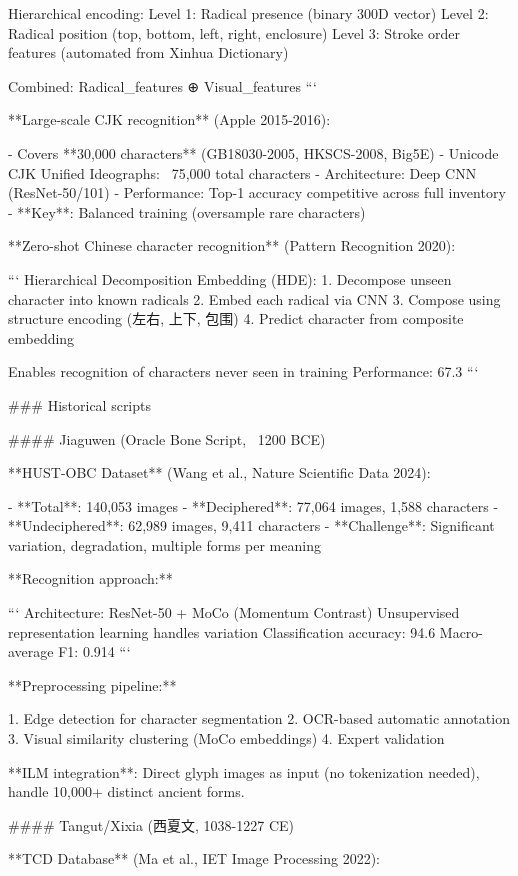\documentclass[11pt]{article}
\begin{document}
Hierarchical encoding:
Level 1: Radical presence (binary 300D vector)
Level 2: Radical position (top, bottom, left, right, enclosure)
Level 3: Stroke order features (automated from Xinhua Dictionary)

Combined: Radical_features ⊕ Visual_features
```

**Large-scale CJK recognition** (Apple 2015-2016):

- Covers **30,000 characters** (GB18030-2005, HKSCS-2008, Big5E)
- Unicode CJK Unified Ideographs: ~75,000 total characters
- Architecture: Deep CNN (ResNet-50/101)
- Performance: Top-1 accuracy competitive across full inventory
- **Key**: Balanced training (oversample rare characters)

**Zero-shot Chinese character recognition** (Pattern Recognition 2020):

```
Hierarchical Decomposition Embedding (HDE):
1. Decompose unseen character into known radicals
2. Embed each radical via CNN
3. Compose using structure encoding (左右, 上下, 包围)
4. Predict character from composite embedding

Enables recognition of characters never seen in training
Performance: 67.3%
```

### Historical scripts

#### Jiaguwen (Oracle Bone Script, ~1200 BCE)

**HUST-OBC Dataset** (Wang et al., Nature Scientific Data 2024):

- **Total**: 140,053 images
- **Deciphered**: 77,064 images, 1,588 characters
- **Undeciphered**: 62,989 images, 9,411 characters
- **Challenge**: Significant variation, degradation, multiple forms per meaning

**Recognition approach:**

```
Architecture: ResNet-50 + MoCo (Momentum Contrast)
Unsupervised representation learning handles variation
Classification accuracy: 94.6%
Macro-average F1: 0.914
```

**Preprocessing pipeline:**

1. Edge detection for character segmentation
2. OCR-based automatic annotation
3. Visual similarity clustering (MoCo embeddings)
4. Expert validation

**ILM integration**: Direct glyph images as input (no tokenization needed), handle 10,000+ distinct ancient forms.

#### Tangut/Xixia (西夏文, 1038-1227 CE)

**TCD Database** (Ma et al., IET Image Processing 2022):
\end{document}
